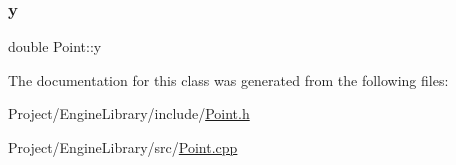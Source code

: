 \subsubsection{\texorpdfstring{y}{y}}
{\footnotesize\ttfamily double Point\+::y}



The documentation for this class was generated from the following files\+:\begin{DoxyCompactItemize}
\item 
Project/\+Engine\+Library/include/\mbox{\hyperlink{_point_8h}{Point.\+h}}\item 
Project/\+Engine\+Library/src/\mbox{\hyperlink{_point_8cpp}{Point.\+cpp}}\end{DoxyCompactItemize}
